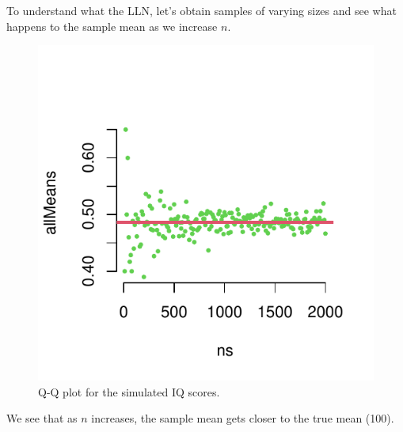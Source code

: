 To understand what the LLN, let's obtain samples of varying sizes and see what happens to the sample mean as we increase $n$. 

\begin{knitrout}
\color{fgcolor}\begin{kframe}
\begin{alltt}
\hlstd{(}\hlstd{)}
 \hlkwb{<-} \hlstd{(}\hlstd{,} \hlstd{,} \hlstd{=}\hlstd{)}
 \hlkwb{<-} 
 \hlkwb{<-} \hlstd{(}
   \hlopt{:}
   \hlkwb{<-}  \hlstd{,} \hlstd{)}
   \hlkwb{<-} 
\hlstd{\}}
 \hlstd{=}\hlstd{,} \hlstd{=}\hlstd{,} \hlstd{=}\hlstd{,} \hlstd{=}\hlstd{)}
\hlstd{(}\hlstd{);} \hlstd{(}\hlstd{)}
\hlstd{(}\hlstd{=}\hlstd{,} \hlstd{=}\hlstd{,}\hlstd{=}\hlstd{)}
\end{alltt}
\end{kframe}\begin{figure}

{\centering \includegraphics[width=\maxwidth]{figure/intro-lln1-2-1} 

}

\caption[Q-Q plot for the simulated IQ scores]{Q-Q plot for the simulated IQ scores.}\label{fig:intro-lln1-2}
\end{figure}

\end{knitrout}

We see that as $n$ increases, the sample mean gets closer to the true mean (100).

